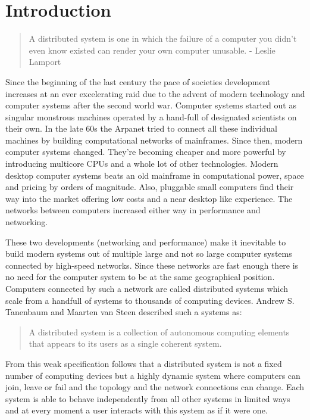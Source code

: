 
\section{Introduction}
\label{sec_1}

\begin{quote}
A distributed system is one in which the failure of a computer you didn't even
know existed can render your own computer unusable. - Leslie Lamport
\end{quote}

Since the beginning of the last century the pace of societies development increases
at an ever excelerating raid due to the advent of modern technology and computer
systems after the second world war. Computer systems started out as singular
monstrous machines operated by a hand-full of designated scientists on
their own. In the late 60s the Arpanet tried to connect all these individual
machines by building computational networks of mainframes. Since then,
modern computer systems changed. They're becoming cheaper and more powerful
by introducing multicore CPUs and a whole lot of other technologies.
Modern desktop computer systems beats an old mainframe in computational power,
space and pricing by orders of magnitude. Also, pluggable small computers
find their way into the market offering low costs and a near desktop like experience.
The networks between computers increased either way in performance and
networking.

These two developments (networking and performance) make it inevitable
to build modern systems out of multiple large and not so large computer
systems connected by high-speed networks. Since these networks are fast
enough there is no need for the computer system to be at the same geographical
position. Computers connected by such a network are called distributed systems
which scale from a handfull of systems to thousands of computing devices. 
Andrew S. Tanenbaum and Maarten van Steen described such a systems as:

\begin{quote}
  A distributed system is a collection of autonomous computing elements
  that appears to its users as a single coherent system.~\cite{tanenbaum2017distributed}
\end{quote}

From this weak specification follows that a distributed system is not a fixed
number of computing devices but a highly dynamic system where computers can
join, leave or fail and the topology and the network connections can change.
Each system is able to behave independently from all other systems in limited
ways and at every moment a user interacts with this system as if it were one.

